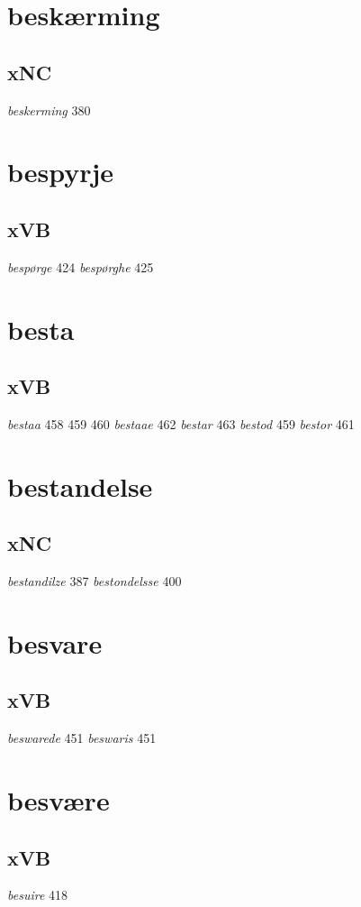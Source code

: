\documentclass[a4paper,twocolumn]{article}
\begin{document}
\section{beskærming}
\label{sec:org07111b5}
\subsection{xNC}
\label{sec:org4b0a953}
\emph{beskerming} 380 
\section{bespyrje}
\label{sec:org8d026f6}
\subsection{xVB}
\label{sec:org2e584e7}
\emph{bespørge} 424 \emph{bespørghe} 425 
\section{besta}
\label{sec:orgdccc1c6}
\subsection{xVB}
\label{sec:org667a889}
\emph{bestaa} 458 459 460 \emph{bestaae} 462 \emph{bestar} 463 \emph{bestod} 459 \emph{bestor} 461 
\section{bestandelse}
\label{sec:orgd26ea83}
\subsection{xNC}
\label{sec:org6165b57}
\emph{bestandilze} 387 \emph{bestondelsse} 400 
\section{besvare}
\label{sec:org14bc468}
\subsection{xVB}
\label{sec:org85b7789}
\emph{beswarede} 451 \emph{beswaris} 451 
\section{besvære}
\label{sec:org03ff11b}
\subsection{xVB}
\label{sec:org3533a1c}
\emph{besuire} 418 
\end{document}
